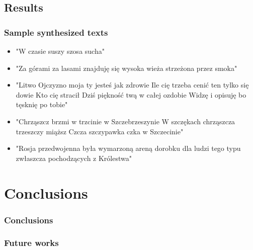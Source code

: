 \documentclass[]{beamer}
\begin{document}
\subsection{Results}
\begin{frame}
    \frametitle{Sample synthesized texts}
    \begin{itemize}
        \item<1-> "W czasie suszy szosa sucha"
        \item<2-> "Za górami za lasami znajduję się wysoka wieża strzeżona przez smoka"
        \item<3-> "Litwo Ojczyzno moja ty jesteś jak zdrowie Ile cię trzeba cenić ten tylko się dowie Kto cię stracił Dziś piękność twą w całej ozdobie Widzę i opisuję bo tęsknię po tobie"
        \item<4-> "Chrząszcz brzmi w trzcinie w Szczebrzeszynie W szczękach chrząszcza trzeszczy miąższ Czcza szczypawka czka w Szczecinie"
        \item<5-> "Rosja przedwojenna była wymarzoną areną dorobku dla ludzi tego typu zwłaszcza pochodzących z Królestwa"
    \end{itemize}
\end{frame}

\section{Conclusions}
\begin{frame}
    \frametitle{Conclusions}
\end{frame}
\begin{frame}
    \frametitle{Future works}
\end{frame}
\end{document}
